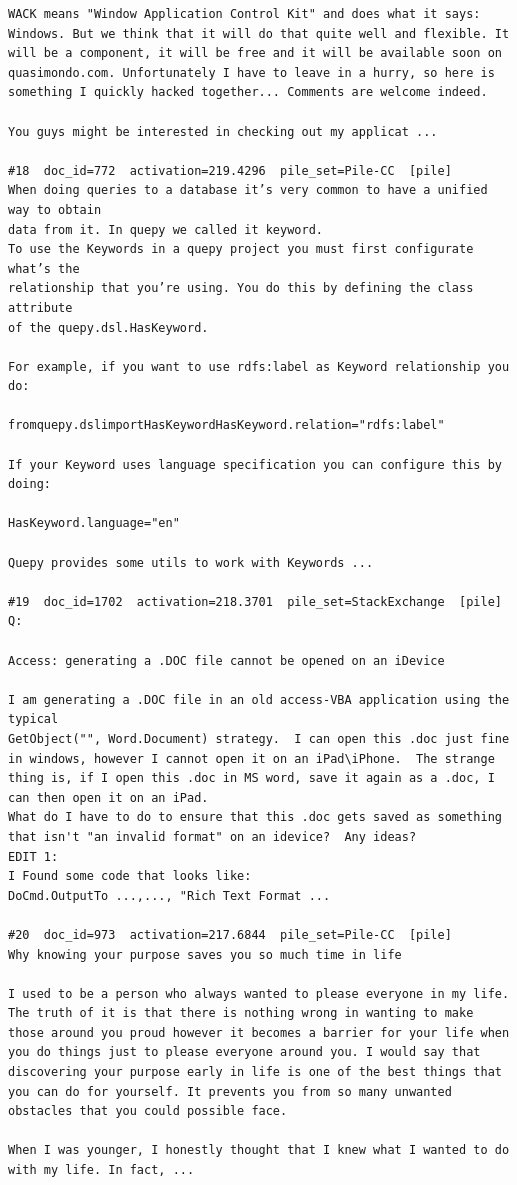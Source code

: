 \begin{verbatim}
WACK means "Window Application Control Kit" and does what it says: Windows. But we think that it will do that quite well and flexible. It will be a component, it will be free and it will be available soon on quasimondo.com. Unfortunately I have to leave in a hurry, so here is something I quickly hacked together... Comments are welcome indeed.

You guys might be interested in checking out my applicat ...

#18  doc_id=772  activation=219.4296  pile_set=Pile-CC  [pile]
When doing queries to a database it’s very common to have a unified way to obtain
data from it. In quepy we called it keyword.
To use the Keywords in a quepy project you must first configurate what’s the
relationship that you’re using. You do this by defining the class attribute
of the quepy.dsl.HasKeyword.

For example, if you want to use rdfs:label as Keyword relationship you do:

fromquepy.dslimportHasKeywordHasKeyword.relation="rdfs:label"

If your Keyword uses language specification you can configure this by doing:

HasKeyword.language="en"

Quepy provides some utils to work with Keywords ...

#19  doc_id=1702  activation=218.3701  pile_set=StackExchange  [pile]
Q:

Access: generating a .DOC file cannot be opened on an iDevice

I am generating a .DOC file in an old access-VBA application using the typical 
GetObject("", Word.Document) strategy.  I can open this .doc just fine in windows, however I cannot open it on an iPad\iPhone.  The strange thing is, if I open this .doc in MS word, save it again as a .doc, I can then open it on an iPad.
What do I have to do to ensure that this .doc gets saved as something that isn't "an invalid format" on an idevice?  Any ideas?  
EDIT 1: 
I Found some code that looks like:
DoCmd.OutputTo ...,..., "Rich Text Format ...

#20  doc_id=973  activation=217.6844  pile_set=Pile-CC  [pile]
Why knowing your purpose saves you so much time in life

I used to be a person who always wanted to please everyone in my life. The truth of it is that there is nothing wrong in wanting to make those around you proud however it becomes a barrier for your life when you do things just to please everyone around you. I would say that discovering your purpose early in life is one of the best things that you can do for yourself. It prevents you from so many unwanted obstacles that you could possible face.

When I was younger, I honestly thought that I knew what I wanted to do with my life. In fact, ...

\end{verbatim}

